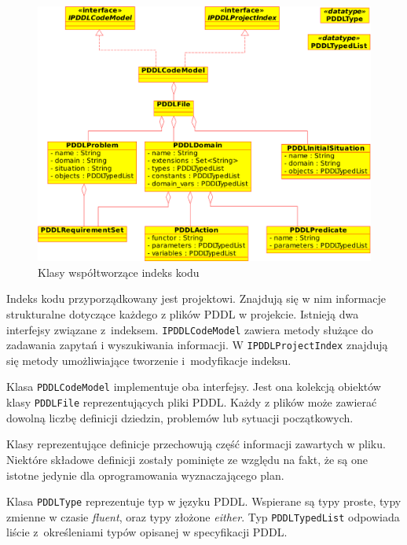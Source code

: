 \begin{figure}[h]
  \centering
    \includegraphics[width=\textwidth]{img/ana_model.pdf}
    \caption{Klasy współtworzące indeks kodu}
    \label{ana_model}
\end{figure}

Indeks kodu przyporządkowany jest projektowi. Znajdują się w nim informacje strukturalne dotyczące każdego
z plików PDDL w projekcie. Istnieją dwa interfejsy związane z~indeksem. \texttt{IPDDLCodeModel}
zawiera metody służące do zadawania zapytań i wyszukiwania informacji. W \texttt{IPDDLProjectIndex}
znajdują się metody umożliwiające tworzenie i~modyfikacje indeksu.

Klasa \texttt{PDDLCodeModel} implementuje oba interfejsy. Jest ona kolekcją obiektów klasy
\texttt{PDDLFile} reprezentujących pliki PDDL. Każdy z plików może zawierać dowolną liczbę
definicji dziedzin, problemów lub sytuacji początkowych.

Klasy reprezentujące definicje przechowują część informacji zawartych w pliku. Niektóre
składowe definicji zostały pominięte ze względu na fakt, że są one istotne jedynie 
dla oprogramowania wyznaczającego plan.

Klasa \texttt{PDDLType} reprezentuje typ w języku PDDL. Wspierane są typy proste, typy 
zmienne w czasie \emph{fluent}, oraz typy złożone \emph{either}.
Typ \texttt{PDDLTypedList} odpowiada liście z~określeniami typów opisanej w specyfikacji PDDL.

